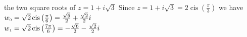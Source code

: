 { the two square roots of $z = 1 + i\sqrt{3}$}
{ Since $z=1 + i\sqrt{3} = 2\operatorname{cis}\left(\frac{\pi}{3}\right)$ we have \\$w_{\text{\tiny$0$}} = \sqrt{2}\operatorname{cis}\left(\frac{\pi}{6}\right) = \frac{\sqrt{6}}{2} +\frac{\sqrt{2}}{2} i$\\$w_{\text{\tiny$1$}} = \sqrt{2}\operatorname{cis}\left(\frac{7\pi}{6}\right) = -\frac{\sqrt{6}}{2}-\frac{\sqrt{2}}{2} i$}
